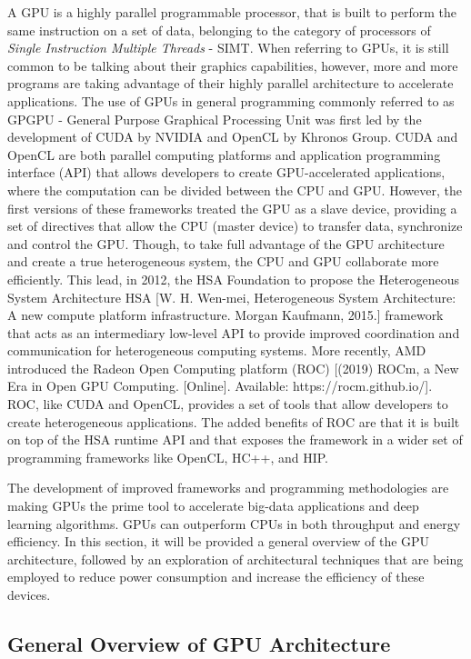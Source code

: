 A GPU is a highly parallel programmable processor, that is built to perform the same instruction on a set of data, belonging to the category of processors of \textit{Single Instruction Multiple Threads} - SIMT. When referring to GPUs, it is still common to be talking about their graphics capabilities, however, more and more programs are taking advantage of their highly parallel architecture to accelerate applications. The use of GPUs in general programming commonly referred to as GPGPU - General Purpose Graphical Processing Unit was first led by the development of CUDA by NVIDIA and OpenCL by Khronos Group. CUDA and OpenCL are both parallel computing platforms and application programming interface (API) that allows developers to create GPU-accelerated applications, where the computation can be divided between the CPU and GPU. However, the first versions of these frameworks treated the GPU as a slave device, providing a set of directives that allow the CPU (master device) to transfer data, synchronize and control the GPU.  Though, to take full advantage of the GPU architecture and create a true heterogeneous system, the CPU and GPU collaborate more efficiently. This lead, in 2012, the HSA Foundation to propose the Heterogeneous System Architecture HSA [W. H. Wen-mei, Heterogeneous System Architecture: A new compute platform infrastructure. Morgan Kaufmann, 2015.] framework that acts as an intermediary low-level API to provide improved coordination and communication for heterogeneous computing systems.  More recently, AMD introduced the Radeon Open Computing platform (ROC) [(2019) ROCm, a New Era in Open GPU Computing. [Online]. Available: https://rocm.github.io/]. ROC, like CUDA and OpenCL, provides a set of tools that allow developers to create heterogeneous applications. The added benefits of ROC are that it is built on top of the HSA runtime API and that exposes the framework in a wider set of programming frameworks like OpenCL, HC++, and HIP.

The development of improved frameworks and programming methodologies are making GPUs the prime tool to accelerate big-data applications and deep learning algorithms. GPUs can outperform CPUs in both throughput and energy efficiency. In this section, it will be provided a general overview of the GPU architecture, followed by an exploration of architectural techniques that are being employed to reduce power consumption and increase the efficiency of these devices.


\subsection{General Overview of GPU Architecture}


